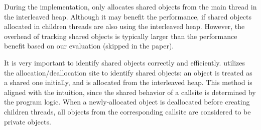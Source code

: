 
 
During the implementation, \NA{} only allocates shared objects from the main thread in the interleaved heap. Although it may benefit the performance, if shared objects allocated in children threads are also using the interleaved heap. However, the overhead of tracking shared objects is typically larger than the performance benefit based on our evaluation (skipped in the paper). 

It is very important to identify shared objects correctly and efficiently. \NA{} utilizes the allocation/deallocation site to identify shared objects: an object is treated as a shared one initially, and is allocated from the interleaved heap. This method is aligned with the intuition, since the shared behavior of a callsite is determined by the program logic. When a newly-allocated object is deallocated before creating children threads, all objects from the corresponding callsite are considered to be private objects. 


